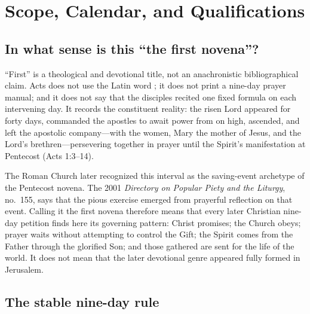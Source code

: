\section{Scope, Calendar, and Qualifications}


\subsection{In what sense is this “the first novena”?}

“First” is a theological and devotional title, not an anachronistic bibliographical claim. Acts does not use the Latin word ; it does not print a nine-day prayer manual; and it does not say that the disciples recited one fixed formula on each intervening day. It records the constituent reality: the risen Lord appeared for forty days, commanded the apostles to await power from on high, ascended, and left the apostolic company---with the women, Mary the mother of Jesus, and the Lord's brethren---persevering together in prayer until the Spirit's manifestation at Pentecost (Acts 1:3--14).

The Roman Church later recognized this interval as the saving-event archetype of the Pentecost novena. The 2001 \textit{Directory on Popular Piety and the Liturgy}, no.~155, says that the pious exercise emerged from prayerful reflection on that event. Calling it the first novena therefore means that every later Christian nine-day petition finds here its governing pattern: Christ promises; the Church obeys; prayer waits without attempting to control the Gift; the Spirit comes from the Father through the glorified Son; and those gathered are sent for the life of the world. It does not mean that the later devotional genre appeared fully formed in Jerusalem.

\subsection{The stable nine-day rule}

